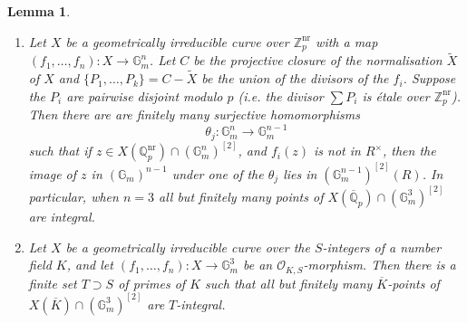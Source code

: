 \documentclass{amsart}
\def\Z{\mathbb Z}
\def\Q{\mathbb Q}
\newtheorem{lemma}{Lemma}
\theoremstyle{definition}
\newcommand{\nr}{\mathrm{nr}}
\begin{document}
\begin{lemma}\label{lemma:integral}
\begin{enumerate}
\item Let $X$ be a geometrically irreducible curve over $\Z _p ^{\nr}$ with a map $(f_1 ,\ldots ,f_n ):X\to \mathbb{G}_m ^n $. Let $C$ be the projective closure of the normalisation $\widetilde{X}$ of $X$ and $\{ P_1 ,\ldots ,P_k \}=C-\widetilde{X}$ be the union of the divisors of the $f_i$. Suppose the $P_i$ are pairwise disjoint modulo $p$ (i.e. the divisor $\sum P_i $ is \'etale over $\Z _p ^{\nr}$). Then there are are finitely many surjective homomorphisms
\[
\theta _j :\mathbb{G}_m ^n \to \mathbb{G}_m ^{n-1}
\]
such that if $z\in X(\Q _p ^{\mathrm{nr}})\cap (\mathbb{G}_m ^n )^{[2]}$, and $f_i (z)$ is not in $R^\times $, then the image of $z$ in $(\mathbb{G}_m )^{n-1}$ under one of the $\theta _j$ lies in $(\mathbb{G}_m ^{n-1})^{[2]}(R)$. In particular, when $n=3$ all but finitely many points of $X(\overline{\Q }_p )\cap (\mathbb{G}_m ^3 )^{[2]}$ are integral.
\item Let $X$ be a geometrically irreducible curve over the $S$-integers of a number field $K$, and let $(f_1 ,\ldots ,f_n ):X\to \mathbb{G}_m ^3$ be an $\mathcal{O}_{K,S}$-morphism. Then there is a finite set $T\supset S$ of primes of $K$ such that all but finitely many $\overline{K}$-points of $X(\overline{K})\cap (\mathbb{G}_m ^3 )^{[2]}$ are $T$-integral.
\end{enumerate}
\end{lemma}
\end{document}
